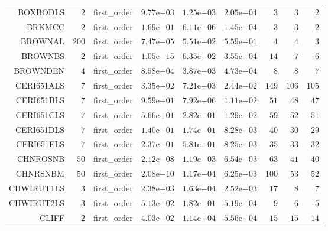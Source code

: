 \begin{longtable}{rrrrrrrrr}
BOXBODLS & \(     2\) & first\_order & \( 9.77\)e\(+03\) & \( 1.25\)e\(-03\) & \( 2.05\)e\(-04\) & \(     3\) & \(     3\) & \(     2\) \\
BRKMCC & \(     2\) & first\_order & \( 1.69\)e\(-01\) & \( 6.11\)e\(-06\) & \( 1.45\)e\(-04\) & \(     3\) & \(     3\) & \(     2\) \\
BROWNAL & \(   200\) & first\_order & \( 7.47\)e\(-05\) & \( 5.51\)e\(-02\) & \( 5.59\)e\(-01\) & \(     4\) & \(     4\) & \(     3\) \\
BROWNBS & \(     2\) & first\_order & \( 1.05\)e\(-15\) & \( 6.35\)e\(-02\) & \( 3.55\)e\(-04\) & \(    14\) & \(     7\) & \(     6\) \\
BROWNDEN & \(     4\) & first\_order & \( 8.58\)e\(+04\) & \( 3.87\)e\(-03\) & \( 4.73\)e\(-04\) & \(     8\) & \(     8\) & \(     7\) \\
CERI651ALS & \(     7\) & first\_order & \( 3.35\)e\(+02\) & \( 7.21\)e\(-03\) & \( 2.44\)e\(-02\) & \(   149\) & \(   106\) & \(   105\) \\
CERI651BLS & \(     7\) & first\_order & \( 9.59\)e\(+01\) & \( 7.92\)e\(-06\) & \( 1.11\)e\(-02\) & \(    51\) & \(    48\) & \(    47\) \\
CERI651CLS & \(     7\) & first\_order & \( 5.66\)e\(+01\) & \( 2.82\)e\(-01\) & \( 1.29\)e\(-02\) & \(    59\) & \(    52\) & \(    51\) \\
CERI651DLS & \(     7\) & first\_order & \( 1.40\)e\(+01\) & \( 1.74\)e\(-01\) & \( 8.28\)e\(-03\) & \(    40\) & \(    30\) & \(    29\) \\
CERI651ELS & \(     7\) & first\_order & \( 2.37\)e\(+01\) & \( 5.81\)e\(-01\) & \( 8.25\)e\(-03\) & \(    35\) & \(    33\) & \(    32\) \\
CHNROSNB & \(    50\) & first\_order & \( 2.12\)e\(-08\) & \( 1.19\)e\(-03\) & \( 6.54\)e\(-03\) & \(    63\) & \(    41\) & \(    40\) \\
CHNRSNBM & \(    50\) & first\_order & \( 2.08\)e\(-10\) & \( 1.17\)e\(-04\) & \( 6.25\)e\(-03\) & \(   100\) & \(    53\) & \(    52\) \\
CHWIRUT1LS & \(     3\) & first\_order & \( 2.38\)e\(+03\) & \( 1.63\)e\(-04\) & \( 2.52\)e\(-03\) & \(    17\) & \(     8\) & \(     7\) \\
CHWIRUT2LS & \(     3\) & first\_order & \( 5.13\)e\(+02\) & \( 1.82\)e\(-01\) & \( 5.19\)e\(-04\) & \(     9\) & \(     6\) & \(     5\) \\
CLIFF & \(     2\) & first\_order & \( 4.03\)e\(+02\) & \( 1.14\)e\(+04\) & \( 5.56\)e\(-04\) & \(    15\) & \(    15\) & \(    14\) \\

\end{longtable}
